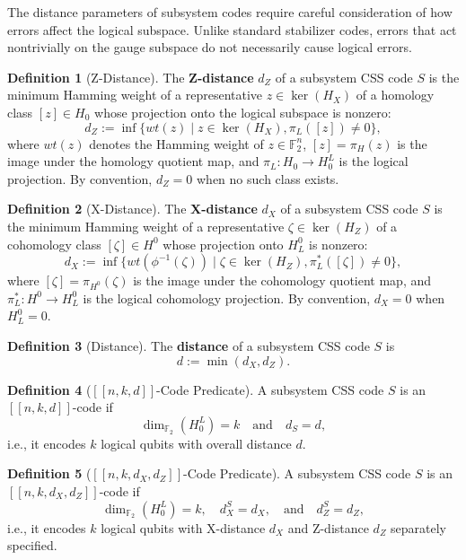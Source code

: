 \documentclass[11pt]{article}
\theoremstyle{plain}
\theoremstyle{definition}
\newtheorem*{definition}{Definition}
\theoremstyle{remark}
\renewcommand{\ker}{\operatorname{ker}}
\begin{document}
The distance parameters of subsystem codes require careful consideration of how errors affect the logical subspace. Unlike standard stabilizer codes, errors that act nontrivially on the gauge subspace do not necessarily cause logical errors.

\begin{definition}[Z-Distance]
The \textbf{Z-distance} $d_Z$ of a subsystem CSS code $S$ is the minimum Hamming weight of a representative $z \in \ker(H_X)$ of a homology class $[z] \in H_0$ whose projection onto the logical subspace is nonzero:
\[
d_Z := \inf\{wt(z) \mid z \in \ker(H_X), \pi_L([z]) \neq 0\},
\]
where $wt(z)$ denotes the Hamming weight of $z \in \mathbb{F}_2^n$, $[z] = \pi_H(z)$ is the image under the homology quotient map, and $\pi_L : H_0 \to H_0^L$ is the logical projection. By convention, $d_Z = 0$ when no such class exists.
\end{definition}

\begin{definition}[X-Distance]
The \textbf{X-distance} $d_X$ of a subsystem CSS code $S$ is the minimum Hamming weight of a representative $\zeta \in \ker(H_Z)$ of a cohomology class $[\zeta] \in H^0$ whose projection onto $H^0_L$ is nonzero:
\[
d_X := \inf\{wt(\phi^{-1}(\zeta)) \mid \zeta \in \ker(H_Z), \pi_L^*([\zeta]) \neq 0\},
\]
where $[\zeta] = \pi_{H^0}(\zeta)$ is the image under the cohomology quotient map, and $\pi_L^* : H^0 \to H^0_L$ is the logical cohomology projection. By convention, $d_X = 0$ when $H^0_L = 0$.
\end{definition}

\begin{definition}[Distance]
The \textbf{distance} of a subsystem CSS code $S$ is
\[
d := \min(d_X, d_Z).
\]
\end{definition}

\begin{definition}[{$[\![n,k,d]\!]$-Code Predicate}]
A subsystem CSS code $S$ is an $[\![n,k,d]\!]$-code if
\[
\dim_{\mathbb{F}_2}(H_0^L) = k \quad \text{and} \quad d_S = d,
\]
i.e., it encodes $k$ logical qubits with overall distance $d$.
\end{definition}

\begin{definition}[{$[\![n,k,d_X,d_Z]\!]$-Code Predicate}]
A subsystem CSS code $S$ is an $[\![n,k,d_X,d_Z]\!]$-code if
\[
\dim_{\mathbb{F}_2}(H_0^L) = k, \quad d_X^S = d_X, \quad \text{and} \quad d_Z^S = d_Z,
\]
i.e., it encodes $k$ logical qubits with X-distance $d_X$ and Z-distance $d_Z$ separately specified.
\end{definition}
\end{document}
